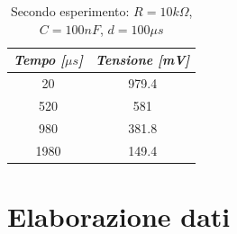     \begin{table}
        \caption{Secondo esperimento: $R = 10k\Omega$,$C = 100nF$, $d=100\mu s$}
        \centering
        \begin{tabular}{|c|c|}
            \hline
            \textit{Tempo [$\mu s$]} & \textit{Tensione [mV]} \\
            \hline
            20 & 979.4 \\
            \hline
            520 & 581 \\
            \hline
            980 & 381.8 \\
            \hline
            1980 & 149.4 \\
            \hline
        \end{tabular}
    \end{table}

    \section{Elaborazione dati}

